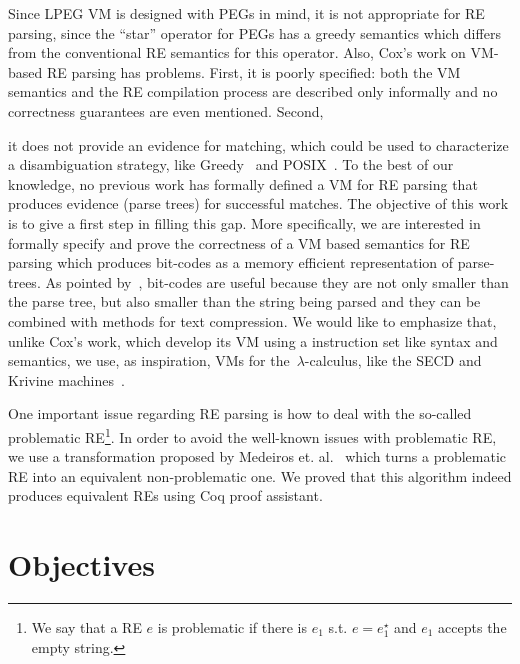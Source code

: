 \documentclass[oneside,12pt]{scrbook}
\theoremstyle{definition}
\theoremstyle{plain}
\theoremstyle{definition}
\begin{document}
Since LPEG VM is designed with PEGs in mind, it is not appropriate for RE parsing, since the ``star''
operator for PEGs has a greedy semantics which differs from the conventional RE semantics for this operator. 
Also, Cox's work on VM-based RE parsing has problems. First, it is poorly specified: both the VM semantics and the RE
compilation process are described only informally and no correctness guarantees are even mentioned. Second,

it does not provide an evidence for matching, which could be used to characterize a disambiguation strategy, like
Greedy~\cite{Frisch2004} and POSIX~\cite{Sulzmann14}. To the best of our knowledge, no 
previous work has formally defined a VM for RE parsing that produces evidence (parse trees) for successful matches.
The objective of this work is to give a first step in filling this gap. More specifically, we are interested in formally
specify and prove the correctness of a VM based semantics for RE parsing which produces bit-codes as
a memory efficient representation of parse-trees. As pointed by~\cite{Lasse2011}, bit-codes are useful because they
are not only smaller than the parse tree, but also smaller than the string being parsed and they can be combined with methods
for text compression. We would like to emphasize that, unlike Cox's work, which develop its VM using a instruction 
set like syntax and semantics, we use, as inspiration, VMs for the~$\lambda$-calculus, like the 
SECD and Krivine machines~\cite{Krivine07,Landin64}. 

One important issue regarding RE parsing is how to deal with the so-called problematic 
RE\footnote{We say that a RE $e$ is problematic if there is $e_1$ s.t. $e = e_1^\star$ and 
	$e_1$ accepts the empty string.}\cite{Frisch2004}. In order to avoid the well-known issues with 
problematic RE, we use a transformation proposed by Medeiros et. al.~\cite{Medeiros14} which turns a
problematic RE into an equivalent non-problematic one. We proved that this algorithm indeed produces
equivalent REs using Coq proof assistant.

\section{Objectives}\label{section:objectives}
\end{document}
